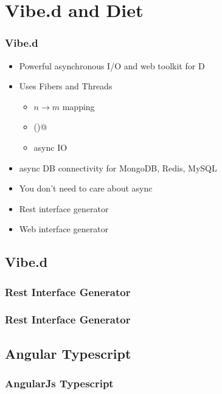 \documentclass[xelatex,13pt]{beamer}
\begin{document}
\section{Vibe.d and Diet}
\begin{frame}
	\frametitle{Vibe.d}
	\begin{itemize}
		\item Powerful asynchronous I/O and web toolkit for D
		\item Uses Fibers and Threads
			\pause
			\begin{itemize}
				\item \(n \rightarrow m\) mapping
				\item \lstinline@yield()@
				\item async IO
			\end{itemize}
			\pause
		\item async DB connectivity for MongoDB, Redis, MySQL
		\item You don't need to care about async
		\item Rest interface generator
		\item Web interface generator
	\end{itemize}
\end{frame}

\subsection{Vibe.d}
\begin{frame}
	\frametitle{Rest Interface Generator}
	
\end{frame}
\begin{frame}
	\frametitle{Rest Interface Generator}
	
	\pause
	\vspace{1cm}
	
\end{frame}

\subsection{Angular Typescript}
\begin{frame}
	\frametitle{AngularJs Typescript}
	
	\pause
	
	\pause
	
\end{frame}
\end{document}
